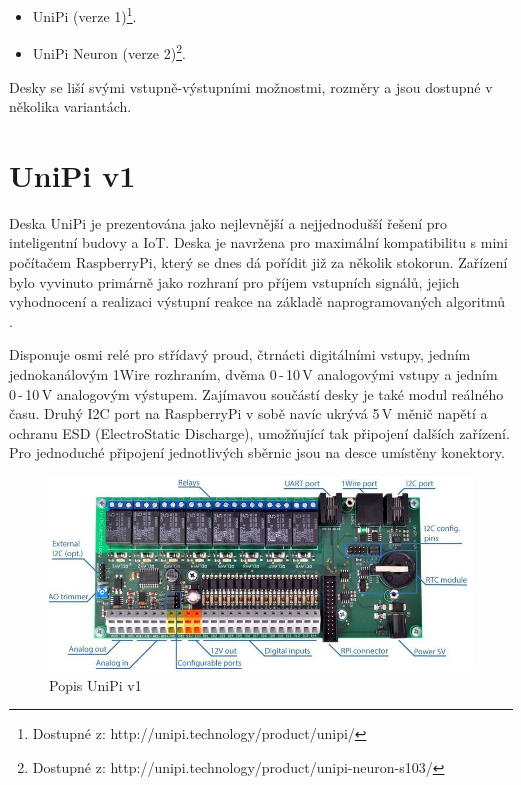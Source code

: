 \begin{itemize}
	\item UniPi (verze 1)\footnote[1]{Dostupné z: http://unipi.technology/product/unipi/}.
	\item UniPi Neuron (verze 2)\footnote[2]{Dostupné z: http://unipi.technology/product/unipi-neuron-s103/}.
\end{itemize}

\vspace{5mm}
Desky se liší svými vstupně-výstupními možnostmi, rozměry a jsou dostupné v několika variantách.




\section{UniPi v1}
\label{KapitolaUnipi1}

Deska UniPi je prezentována jako nejlevnější a nejjednodušší řešení pro inteligentní budovy a IoT. Deska je navržena pro maximální kompatibilitu s mini počítačem RaspberryPi, který se dnes dá pořídit již za několik stokorun.  Zařízení bylo vyvinuto primárně jako rozhraní pro příjem vstupních signálů, jejich vyhodnocení a realizaci výstupní reakce na základě naprogramovaných algoritmů \cite{UniPiBoard1}.

Disponuje osmi relé pro střídavý proud, čtrnácti digitálními vstupy, jedním jednokanálovým 1Wire rozhraním, dvěma 0\,-\,10\,V analogovými vstupy a jedním 0\,-\,10\,V analogovým výstupem. Zajímavou součástí desky je také modul reálného času. Druhý I2C port na RaspberryPi v sobě navíc ukrývá 5\,V měnič napětí a ochranu ESD (ElectroStatic Discharge), umožňující tak připojení dalších zařízení. Pro jednoduché připojení jednotlivých sběrnic jsou na desce umístěny konektory.

 \begin{figure}[!h]
  \begin{center}
    \includegraphics[scale=0.7]{obrazky/unipi_v1}
  \end{center}
  \caption{Popis UniPi v1 \cite{UniPiBoard1}}
\end{figure}

